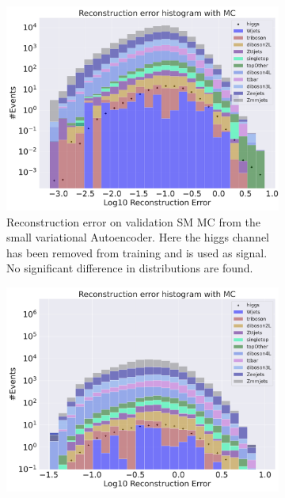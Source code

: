 \begin{figure}[h!]
    \centering
    \begin{subfigure}{.45\textwidth}
        \includegraphics[width=\textwidth]{Figures/VAE_testing/small/b_data_recon_big_rm3_feats_sig_higgs.pdf}
        \caption{Reconstruction error on validation SM MC from the small variational Autoencoder. Here the higgs channel has been removed from training and 
        is used as signal. No significant difference in distributions are found.}
        \label{fig:vae_small_higgs}
    \end{subfigure}
    \hfill 
    \begin{subfigure}{.45\textwidth}
        \includegraphics[width=\textwidth]{Figures/VAE_testing/big/b_data_recon_big_rm3_feats_sig_higgs.pdf}

\end{subfigure}
\end{figure}
